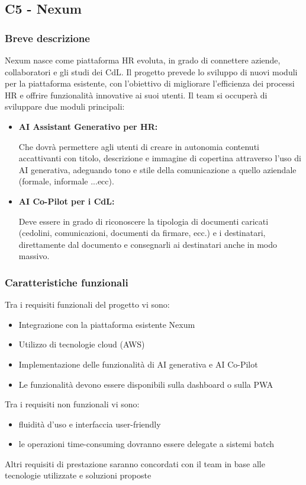 \documentclass[a4paper,11pt]{article}
\begin{document}
\newpage
\subsection{C5 - Nexum}
\subsubsection{Breve descrizione}
\parbox[t]{\linewidth}{%
Nexum nasce come piattaforma HR evoluta, in grado di connettere aziende, collaboratori e gli studi dei CdL. Il progetto prevede lo sviluppo di nuovi moduli per la piattaforma esistente, con l'obiettivo di migliorare l'efficienza dei processi HR e offrire funzionalità innovative ai suoi utenti.
Il team si occuperà di sviluppare due moduli principali:
}

\begin{itemize}
\item \textbf{AI Assistant Generativo per HR:} \\
\begin{minipage}[t]{\dimexpr\linewidth-2em}
Che dovrà permettere agli utenti di creare in autonomia contenuti accattivanti con titolo, descrizione e immagine di copertina attraverso l'uso di AI generativa, adeguando tono e stile della comunicazione a quello aziendale (formale, informale ...ecc).
\end{minipage}

\item \textbf{AI Co-Pilot per i CdL:} \\
\begin{minipage}[t]{\dimexpr\linewidth-2em}
Deve essere in grado di riconoscere la tipologia di documenti caricati (cedolini, comunicazioni, documenti da firmare, ecc.) e i destinatari, direttamente dal documento e consegnarli ai destinatari anche in modo massivo.
\end{minipage}
\end{itemize}

\subsubsection{Caratteristiche funzionali}
Tra i requisiti funzionali del progetto vi sono:
\begin{itemize}[noitemsep, topsep=0pt]
 \item Integrazione con la piattaforma esistente Nexum
 \item Utilizzo di tecnologie cloud (AWS)
 \item Implementazione delle funzionalità di AI generativa e AI Co-Pilot
 \item Le funzionalità devono essere disponibili sulla dashboard o sulla PWA
\end{itemize}
Tra i requisiti non funzionali vi sono:
\begin{itemize}[noitemsep, topsep=0pt]
 \item fluidità d'uso e interfaccia user-friendly
 \item le operazioni time-consuming dovranno essere delegate a sistemi batch
\end{itemize}
Altri requisiti di prestazione saranno concordati con il team in base alle tecnologie utilizzate e soluzioni proposte
\end{document}
